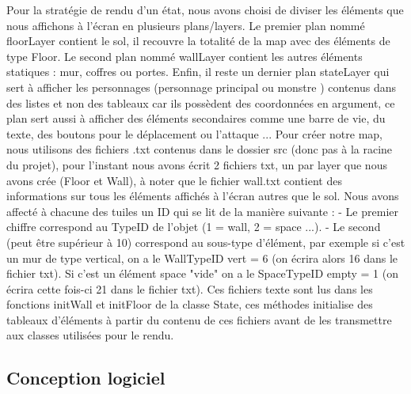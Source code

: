 \documentclass[a4paper,12pt]{article}
\begin{document}
Pour la stratégie de rendu d'un état, nous avons choisi de diviser les éléments que nous affichons à l'écran en plusieurs plans/layers.
\bigbreak
Le premier plan nommé floorLayer contient le sol, il recouvre la totalité de la map avec des éléments de type Floor.
Le second plan nommé wallLayer contient les autres éléments statiques : mur, coffres ou portes.
Enfin, il reste un dernier plan stateLayer qui sert à afficher les personnages (personnage principal ou monstre ) contenus dans des listes et non des tableaux car ils possèdent des coordonnées en argument, ce plan sert aussi à afficher des éléments secondaires comme une barre de vie, du texte, des boutons pour le déplacement ou l'attaque ...
\bigbreak
Pour créer notre map, nous utilisons des fichiers .txt contenus dans le dossier src (donc pas à la racine du projet), pour l'instant nous avons écrit 2 fichiers txt, un par layer que nous avons crée (Floor et Wall), à noter que le fichier wall.txt contient des informations sur tous les éléments affichés à l'écran autres que le sol.
Nous avons affecté à chacune des tuiles un ID qui se lit de la manière suivante :
- Le premier chiffre correspond au TypeID de l'objet (1 = wall, 2 = space ...).
- Le second (peut être supérieur à 10) correspond au sous-type d'élément, par exemple si c'est un mur de type vertical, on a le WallTypeID vert = 6 (on écrira alors 16 dans le fichier txt). Si c'est un élément space "vide" on a le SpaceTypeID empty = 1 (on écrira cette fois-ci 21 dans le fichier txt).
Ces fichiers texte sont lus dans les fonctions initWall et initFloor de la classe State, ces méthodes initialise des tableaux d'éléments à partir du contenu de ces fichiers avant de les transmettre aux classes utilisées pour le rendu.


\subsection{Conception logiciel}
\end{document}
